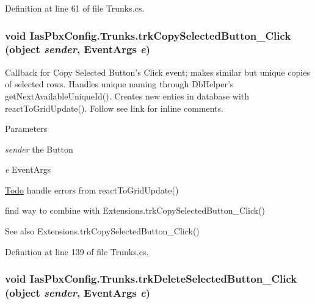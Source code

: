 Definition at line 61 of file Trunks.cs.\hypertarget{class_ias_pbx_config_1_1_trunks_af34b4b2a4839c640dedb158ecd9b4756}{
\subsubsection[{trkCopySelectedButton\_\-Click}]{\setlength{\rightskip}{0pt plus 5cm}void IasPbxConfig.Trunks.trkCopySelectedButton\_\-Click (object {\em sender}, \/  EventArgs {\em e})}}
\label{class_ias_pbx_config_1_1_trunks_af34b4b2a4839c640dedb158ecd9b4756}


Callback for Copy Selected Button's Click event; makes similar but unique copies of selected rows. Handles unique naming through DbHelper's getNextAvailableUniqueId(). Creates new enties in database with reactToGridUpdate(). Follow see link for inline comments. 
\begin{DoxyParams}{Parameters}
\item[{\em sender}]the Button \item[{\em e}]EventArgs \end{DoxyParams}
\begin{Desc}
\item[\hyperlink{todo__todo000053}{Todo}]handle errors from reactToGridUpdate() 

find way to combine with Extensions.trkCopySelectedButton\_\-Click() \end{Desc}
\begin{DoxySeeAlso}{See also}
Extensions.trkCopySelectedButton\_\-Click() 
\end{DoxySeeAlso}


Definition at line 139 of file Trunks.cs.\hypertarget{class_ias_pbx_config_1_1_trunks_a0bcc050f33753a70b2918424ad6ceca9}{
\subsubsection[{trkDeleteSelectedButton\_\-Click}]{\setlength{\rightskip}{0pt plus 5cm}void IasPbxConfig.Trunks.trkDeleteSelectedButton\_\-Click (object {\em sender}, \/  EventArgs {\em e})}}
\label{class_ias_pbx_config_1_1_trunks_a0bcc050f33753a70b2918424ad6ceca9}


